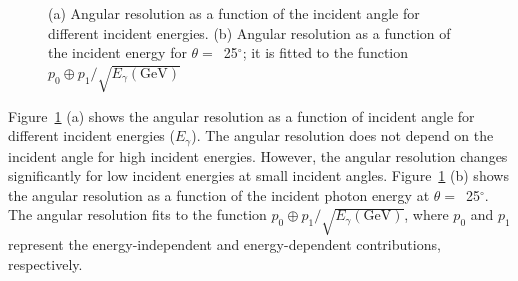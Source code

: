 \documentclass[preprint,12pt,times,a4paper]{elsarticle}
\begin{document}
\begin{figure}[!hbt]
\centering
{}
\caption{ (a) Angular resolution as a function of the incident angle for different incident energies. (b) Angular resolution as a function of the incident energy for $\theta=$~25$^{\circ}$; it is fitted to the function $p_{0} \oplus p_{1}/\sqrt{E_{\gamma}(\mathrm{GeV})}$ }
\label{fig:angle_reco_dep_gr}
\end{figure}

Figure~\ref{fig:angle_reco_dep_gr} (a) shows the angular resolution as a function of incident angle for different incident energies ($E_{\gamma}$). The angular resolution does not depend on the incident angle for high incident energies. However, the angular resolution changes significantly for low incident energies at small incident angles. Figure~\ref{fig:angle_reco_dep_gr} (b) shows the angular resolution as a function of the incident photon energy at $\theta=$~25$^{\circ}$. The angular resolution fits to the function $p_{0} \oplus p_{1}/\sqrt{E_{\gamma}(\mathrm{GeV})}$, where $p_{0}$ and $p_{1}$ represent the energy-independent and energy-dependent contributions, respectively.
\end{document}
